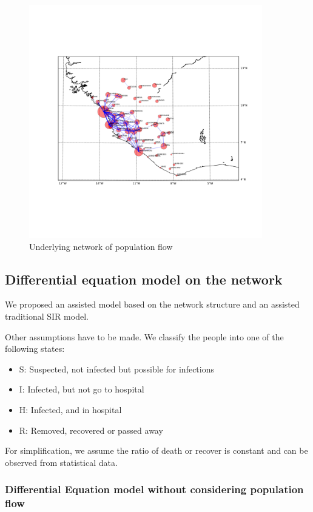 \documentclass[12pt]{article}
\begin{document}
\begin{figure}[hbt]
\begin{center}
  \includegraphics[width=4in]{graph/network2.pdf}
  \caption{Underlying network of population flow}
  \label{network}
\end{center}  
\end{figure}

\subsection{Differential equation model on the network}

We proposed an assisted model based on the network structure and an assisted traditional SIR model.

Other assumptions have to be made. We classify the people into one of the following states:

\begin{itemize}
    \item S: Suspected, not infected but possible for infections
    \item I: Infected, but not go to hospital
    \item H: Infected, and in hospital
    \item R: Removed, recovered or passed away
\end{itemize}

For simplification, we assume the ratio of death or recover is constant and can be observed from statistical data.

\subsubsection{Differential Equation model without considering population flow}
\end{document}
